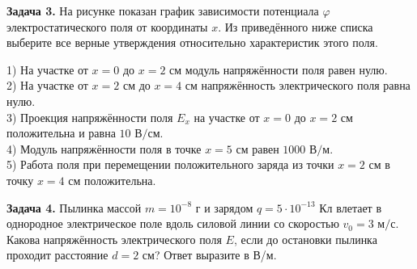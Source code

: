 \begin{taskbasic}[code={\label{task:elem_pot_v27_n15}}]
\textbf{Задача 3.} На рисунке показан график зависимости потенциала $\varphi$ электростатического поля от координаты $x$. Из приведённого ниже списка выберите все верные утверждения относительно характеристик этого поля.

\nopagebreak\smallskip
\begin{center}
\end{center}

1) На участке от $x = 0$ до $x = 2\text{ см}$ модуль напряжённости поля равен нулю.\\
2) На участке от $x = 2\text{ см}$ до $x = 4\text{ см}$ напряжённость электрического поля равна нулю.\\
3) Проекция напряжённости поля $E_x$ на участке от $x = 0$ до $x = 2\text{ см}$ положительна и равна $10\text{ В/см}$.\\
4) Модуль напряжённости поля в точке $x = 5\text{ см}$ равен $1000\text{ В/м}$.\\
5) Работа поля при перемещении положительного заряда из точки $x = 2\text{ см}$ в точку $x = 4\text{ см}$ положительна.

\end{taskbasic}

\begin{taskbasic}[code={\label{task:elem_pot_v28_n25}}]
\textbf{Задача 4.} Пылинка массой $m = 10^{-8}\text{ г}$ и зарядом $q = 5\cdot 10^{-13}\text{ Кл}$ влетает в однородное электрическое поле вдоль силовой линии со скоростью $v_0 = 3\text{ м/с}$. Какова напряжённость электрического поля $E$, если до остановки пылинка проходит расстояние $d = 2\text{ см}$? Ответ выразите в В/м.

\end{taskbasic}
